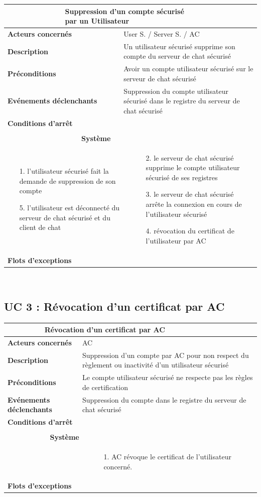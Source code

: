 \documentclass[a4paper,11pt,french]{article}
\newcommand{\fiche}[9] {
	\noindent
\begin{tabular}{|p{3.5cm}| p{1cm} | p{3cm} | p{.5cm} | p{7cm}|} 
\hline
\rowcolor{blue}
\multicolumn{2}{|l|}{\color{white}\bfseries{Nom}} & \multicolumn{3}{l|}{\color{white}\bfseries{#1}}\\
\hline
\multicolumn{2}{|l|}{\bfseries{Acteurs concernés}} & \multicolumn{3}{m{10.5cm}|}{#2}\\
\hline
\multicolumn{2}{|l|}{\bfseries{Description}} & \multicolumn{3}{m{10.5cm}|}{#3}\\
\hline
\multicolumn{2}{|l|}{\bfseries{Préconditions}} & \multicolumn{3}{m{10.5cm}|}{#4}\\
\hline
\multicolumn{2}{|l|}{\bfseries{Evénements déclenchants}} & \multicolumn{3}{m{10.5cm}|}{#5}\\
\hline
\multicolumn{2}{|l|}{\bfseries{Conditions d'arrêt}} & \multicolumn{3}{m{10.5cm}|}{#6}\\
\hline
\rowcolor{gray}
\multicolumn{5}{|c|}{\bfseries{Description du flot d'événements principal}}\\
\hline
\rowcolor{gray}
\multicolumn{3}{|c|}{\bfseries{Acteur(s)}} & \multicolumn{2}{c|}{\bfseries{Système}}\\
\hline
\multicolumn{3}{|p{7.5cm}|}{#7} & \multicolumn{2}{p{7.5cm}|}{#8}\\
\hline
\multicolumn{2}{|l}{\bfseries{Flots d'exceptions}} & \multicolumn{3}{|p{11.5cm}|}{#9}\\
\hline
\end{tabular}
\\
}
\begin{document}
\fiche
	{Suppression d’un compte sécurisé par un Utilisateur} %
	{User S. / Server S. / AC} %
	{Un utilisateur sécurisé supprime son compte du serveur de chat sécurisé} %
	{Avoir un compte utilisateur sécurisé sur le serveur de chat sécurisé} %
	{Suppression du compte utilisateur sécurisé dans le registre du serveur de chat sécurisé} %
	{} %
	{\begin{itemize}  %
		\item [1.] l’utilisateur sécurisé fait la demande de suppression de son compte
		\item []
		\item []
		\item []
		\item []
		\item []
		\item [5.] l’utilisateur est déconnecté du serveur de chat sécurisé et du client de chat
	 \end{itemize}
	} 
	{\begin{itemize}  %
		\item []
		\item []
		\item [2.] le serveur de chat sécurisé supprime le compte utilisateur sécurisé de ses registres
		\item [3.] le serveur de chat sécurisé arrête la connexion en cours de l’utilisateur sécurisé
		\item [4.] révocation du certificat de l’utilisateur par AC
	 \end{itemize}
	 }
	{} %

\subsection{UC 3 : Révocation d’un certificat par AC}

\fiche
	{Révocation d’un certificat par AC} %
	{AC} %
	{Suppression d’un compte par AC pour non respect du règlement ou inactivité d’un utilisateur sécurisé} %
	{Le compte utilisateur sécurisé ne respecte pas les règles de certification} %
	{Suppression du compte dans le registre du serveur de chat sécurisé} %
	{} %
	{\begin{itemize}  %
		\item [] 
	 \end{itemize}
	} 
	{\begin{itemize}  %
		\item [1.] AC révoque le certificat de l'utilisateur concerné.
	 \end{itemize}
	 }
	{} %
\end{document}

